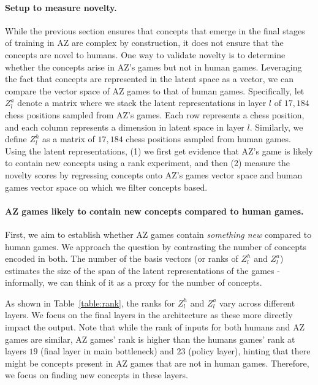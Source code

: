 \documentclass{article}
\begin{document}
\paragraph{Setup to measure novelty.}
While the previous section ensures that concepts that emerge in the final stages of training in AZ are complex by construction, it does not ensure that the concepts are novel to humans. One way to validate novelty is to determine whether the concepts arise in AZ's games but not in human games. 
Leveraging the fact that concepts are represented in the latent space as a vector, 
we can compare the vector space of AZ games to that of human games.
Specifically, let $Z_l^a$ denote a matrix where we stack the latent representations in layer $l$ of $17,184$ chess positions sampled from AZ's games. 
Each row represents a chess position, and each column represents a dimension in latent space in layer $l$.
Similarly, we define $Z_l^h$ as a matrix of $17,184$ chess positions sampled from human games. 
Using the latent representations, (1) we first get evidence that AZ's game is likely to contain new concepts using a rank experiment, and then (2) measure the novelty scores by regressing concepts onto AZ's games vector space and human games vector space on which we filter concepts based. 

\paragraph{AZ games likely to contain new concepts compared to human games.\label{sec:rank}} 
First, we aim to establish whether AZ games contain \textit{something new} compared to human games. We approach the question by contrasting the number of concepts encoded in both. The number of the basis vectors (or ranks of $Z_l^h$ and $Z_l^a$) estimates the size of the span of the latent representations of the games - informally, we can think of it as a proxy for the number of concepts. 

As shown in Table~\ref{table:rank}, the ranks for $Z_l^h$ and $Z_l^a$ vary across different layers. We focus on the final layers in the architecture as these more directly impact the output. 
Note that while the rank of inputs for both humans and AZ games are similar, AZ games' rank is higher than the humans games' rank at layers $19$ (final layer in main bottleneck) and $23$ (policy layer), hinting that there might be concepts present in AZ games that are not in human games.
Therefore, we focus on finding new concepts in these layers. 
\end{document}
